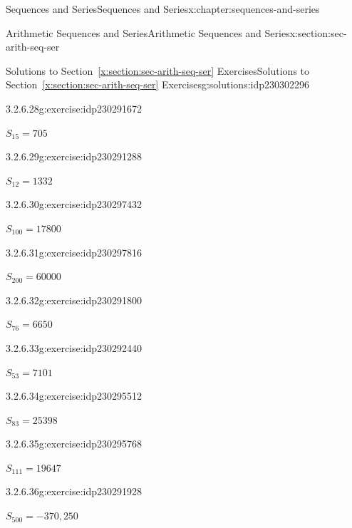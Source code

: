 \documentclass[twoside,10pt,]{book}
\newcommand{\xreffont}{\relax}
\numberwithin{equation}{section}
\begin{document}
\begin{chapterptx}{Sequences and Series}{}{Sequences and Series}{}{}{x:chapter:sequences-and-series}
\begin{sectionptx}{Arithmetic Sequences and Series}{}{Arithmetic Sequences and Series}{}{}{x:section:sec-arith-seq-ser}
\begin{solutions-subsection}{Solutions to Section~{\xreffont\ref*{x:section:sec-arith-seq-ser}} Exercises}{}{Solutions to Section~{\xreffont\ref*{x:section:sec-arith-seq-ser}} Exercises}{}{}{g:solutions:idp230302296}
\begin{divisionsolution}{3.2.6.28}{}{g:exercise:idp230291672}%
\par\smallskip%
\noindent\hypertarget{g:solution:idp230284632-main}{}\(S_{15} = 705\)\end{divisionsolution}%
\begin{divisionsolution}{3.2.6.29}{}{g:exercise:idp230291288}%
\par\smallskip%
\noindent\hypertarget{g:solution:idp230292824-main}{}\(S_{12} = 1332\)\end{divisionsolution}%
\begin{divisionsolution}{3.2.6.30}{}{g:exercise:idp230297432}%
\par\smallskip%
\noindent\hypertarget{g:solution:idp230292312-main}{}\(S_{100} = 17800\)\end{divisionsolution}%
\begin{divisionsolution}{3.2.6.31}{}{g:exercise:idp230297816}%
\par\smallskip%
\noindent\hypertarget{g:solution:idp230296408-main}{}\(S_{200} = 60000\)\end{divisionsolution}%
\begin{divisionsolution}{3.2.6.32}{}{g:exercise:idp230291800}%
\par\smallskip%
\noindent\hypertarget{g:solution:idp230296024-main}{}\(S_{76} = 6650\)\end{divisionsolution}%
\begin{exercisegroup}
\begin{divisionsolutioneg}{3.2.6.33}{}{g:exercise:idp230292440}%
\par\smallskip%
\noindent\hypertarget{g:solution:idp230299224-main}{}\(S_{53} = 7101\)\end{divisionsolutioneg}%
\begin{divisionsolutioneg}{3.2.6.34}{}{g:exercise:idp230295512}%
\par\smallskip%
\noindent\hypertarget{g:solution:idp230298200-main}{}\(S_{83} = 25398\)\end{divisionsolutioneg}%
\begin{divisionsolutioneg}{3.2.6.35}{}{g:exercise:idp230295768}%
\par\smallskip%
\noindent\hypertarget{g:solution:idp230293976-main}{}\(S_{111} = 19647\)\end{divisionsolutioneg}%
\begin{divisionsolutioneg}{3.2.6.36}{}{g:exercise:idp230291928}%
\par\smallskip%
\noindent\hypertarget{g:solution:idp230293080-main}{}\(S_{500} = -370,250\)\end{divisionsolutioneg}%

\end{exercisegroup}
\end{solutions-subsection}
\end{sectionptx}
\end{chapterptx}
\end{document}
